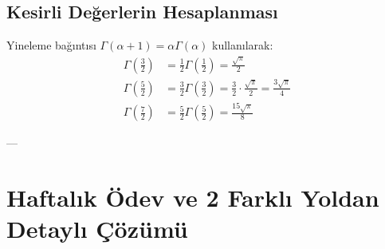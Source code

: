 \documentclass[12pt,a4paper]{article}
\begin{document}
\subsection{Kesirli Değerlerin Hesaplanması}
Yineleme bağıntısı $\Gamma(\alpha+1) = \alpha \Gamma(\alpha)$ kullanılarak:
\begin{align}
    \Gamma\left(\frac{3}{2}\right) &= \frac{1}{2} \Gamma\left(\frac{1}{2}\right) = \frac{\sqrt{\pi}}{2} \\
    \Gamma\left(\frac{5}{2}\right) &= \frac{3}{2} \Gamma\left(\frac{3}{2}\right) = \frac{3}{2} \cdot \frac{\sqrt{\pi}}{2} = \frac{3\sqrt{\pi}}{4} \\
    \Gamma\left(\frac{7}{2}\right) &= \frac{5}{2} \Gamma\left(\frac{5}{2}\right) = \frac{15\sqrt{\pi}}{8}
\end{align}

---

\section{Haftalık Ödev ve 2 Farklı Yoldan Detaylı Çözümü}
\end{document}
